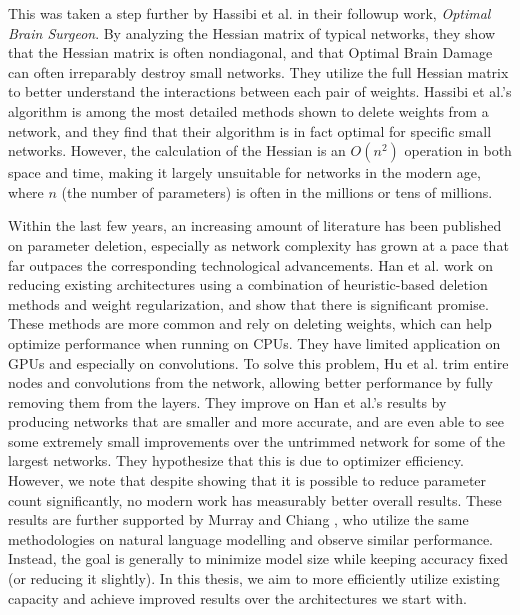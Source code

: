 This was taken a step further by Hassibi et al. \cite{hassibi1993second} in their followup work, \emph{Optimal Brain Surgeon}.
By analyzing the Hessian matrix of typical networks, they show that the Hessian matrix is often nondiagonal, and that Optimal Brain Damage can often irreparably destroy small networks.
They utilize the full Hessian matrix to better understand the interactions between each pair of weights.
Hassibi et al.'s algorithm is among the most detailed methods shown to delete weights from a network, and they find that their algorithm is in fact optimal for specific small networks.
However, the calculation of the Hessian is an $O(n^2)$ operation in both space and time, making it largely unsuitable for networks in the modern age, where $n$ (the number of parameters) is often in the millions or tens of millions.

Within the last few years, an increasing amount of literature has been published on parameter deletion, especially as network complexity has grown at a pace that far outpaces the corresponding technological advancements.
Han et al. \cite{han2015learning} work on reducing existing architectures using a combination of heuristic-based deletion methods and weight regularization, and show that there is significant promise.
These methods are more common and rely on deleting weights, which can help optimize performance when running on CPUs.
They have limited application on GPUs and especially on convolutions.
To solve this problem, Hu et al. \cite{hu2016network} trim entire nodes and convolutions from the network, allowing better performance by fully removing them from the layers.
They improve on Han et al.'s results by producing networks that are smaller and more accurate, and are even able to see some extremely small improvements over the untrimmed network for some of the largest networks.
They hypothesize that this is due to optimizer efficiency.
However, we note that despite showing that it is possible to reduce parameter count significantly, no modern work has measurably better overall results.
These results are further supported by Murray and Chiang \cite{murray2015auto}, who utilize the same methodologies on natural language modelling and observe similar performance.
Instead, the goal is generally to minimize model size while keeping accuracy fixed (or reducing it slightly).
In this thesis, we aim to more efficiently utilize existing capacity and achieve improved results over the architectures we start with.

